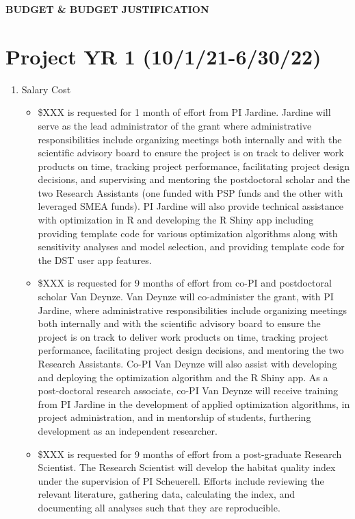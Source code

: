\begin{center} \textbf{BUDGET \& BUDGET JUSTIFICATION} \end{center}


\section{Project YR 1 (10/1/21-6/30/22)}
\begin{enumerate}
\item Salary Cost
\begin{itemize}
\item  \$XXX is requested for 1 month of effort from PI Jardine. Jardine will serve as the lead administrator of the grant where administrative responsibilities include organizing meetings both internally and with the scientific advisory board to ensure the project is on track to deliver work products on time, tracking project performance, facilitating project design decisions, and supervising and mentoring the postdoctoral scholar and the two Research Assistants (one funded with PSP funds and the other with leveraged SMEA funds). PI Jardine will also provide technical assistance with optimization in R and developing the R Shiny app including providing template code for various optimization algorithms along with sensitivity analyses and model selection, and providing template code for the DST user app features.
\item \$XXX is requested for 9 months of effort from co-PI and postdoctoral scholar Van Deynze. Van Deynze will co-administer the grant, with PI Jardine, where administrative responsibilities include organizing meetings both internally and with the scientific advisory board to ensure the project is on track to deliver work products on time, tracking project performance, facilitating project design decisions, and mentoring the two Research Assistants. Co-PI Van Deynze will also assist with developing and deploying the optimization algorithm and the R Shiny app. As a post-doctoral research associate, co-PI Van Deynze will receive training from PI Jardine in the development of applied optimization algorithms, in project administration, and in mentorship of students, furthering development as an independent researcher. 
\item \$XXX is requested for 9 months of effort from a post-graduate Research Scientist. The Research Scientist will develop the habitat quality index under the supervision of PI Scheuerell. Efforts include reviewing the relevant literature, gathering data, calculating the index, and documenting all analyses such that they are reproducible.

\end{itemize}
\end{enumerate}
